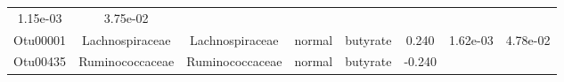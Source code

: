 \documentclass[11pt,]{article}
\begin{document}
\begin{longtable}[]{@{}cccccccc@{}}
\begin{minipage}[t]{0.08\columnwidth}
1.15e-03\strut
\end{minipage} & \begin{minipage}[t]{0.08\columnwidth}\centering\strut
3.75e-02\strut
\end{minipage}\tabularnewline
\begin{minipage}[t]{0.08\columnwidth}\centering\strut
Otu00001\strut
\end{minipage} & \begin{minipage}[t]{0.15\columnwidth}\centering\strut
Lachnospiraceae\strut
\end{minipage} & \begin{minipage}[t]{0.15\columnwidth}\centering\strut
Lachnospiraceae\strut
\end{minipage} & \begin{minipage}[t]{0.08\columnwidth}\centering\strut
normal\strut
\end{minipage} & \begin{minipage}[t]{0.09\columnwidth}\centering\strut
butyrate\strut
\end{minipage} & \begin{minipage}[t]{0.07\columnwidth}\centering\strut
0.240\strut
\end{minipage} & \begin{minipage}[t]{0.08\columnwidth}\centering\strut
1.62e-03\strut
\end{minipage} & \begin{minipage}[t]{0.08\columnwidth}\centering\strut
4.78e-02\strut
\end{minipage}\tabularnewline
\begin{minipage}[t]{0.08\columnwidth}\centering\strut
Otu00435\strut
\end{minipage} & \begin{minipage}[t]{0.15\columnwidth}\centering\strut
Ruminococcaceae\strut
\end{minipage} & \begin{minipage}[t]{0.15\columnwidth}\centering\strut
Ruminococcaceae\strut
\end{minipage} & \begin{minipage}[t]{0.08\columnwidth}\centering\strut
normal\strut
\end{minipage} & \begin{minipage}[t]{0.09\columnwidth}\centering\strut
butyrate\strut
\end{minipage} & \begin{minipage}[t]{0.07\columnwidth}\centering\strut
-0.240\strut
\end{minipage} & \begin{minipage}[t]{0.08\columnwidth}\centering\strut

\end{minipage}
\end{longtable}
\end{document}
